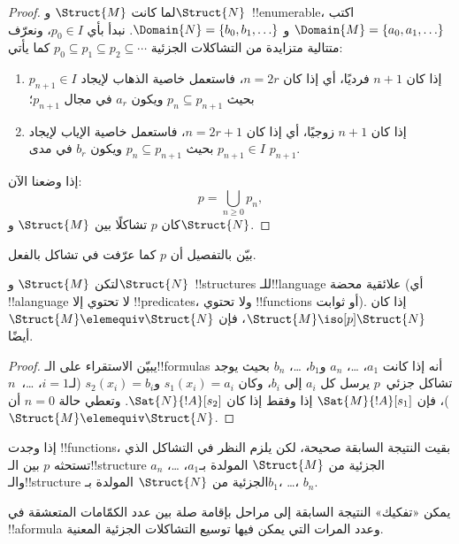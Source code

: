 \documentclass[../../../include/open-logic-section]{subfiles}
\begin{document}
\begin{proof}
  لما كانت $\Struct{M}$ و$\Struct{N}$~!!{enumerable}، اكتب
  $\Domain{M} = \{a_0, a_1, \ldots \}$ و
  $\Domain{N} = \{b_0, b_1, \ldots \}$. نبدأ بأي $p_0 \in I$، ونعرّف
  متتالية متزايدة من التشاكلات الجزئية
  $p_0 \subseteq p_1 \subseteq p_2 \subseteq \cdots$ كما يأتي:
  \begin{enumerate}
  \item إذا كان $n+1$ فرديًا، أي إذا كان $n = 2r$، فاستعمل خاصية الذهاب
    لإيجاد $p_{n+1} \in I$ بحيث $p_n \subseteq p_{n+1}$ ويكون $a_r$
    في مجال $p_{n+1}$؛
  \item إذا كان $n+1$ زوجيًا، أي إذا كان $n=2r+1$، فاستعمل خاصية الإياب
    لإيجاد $p_{n+1} \in I$ بحيث $p_n \subseteq p_{n+1}$ ويكون $b_r$
    في مدى $p_{n+1}$.
  \end{enumerate}
إذا وضعنا الآن:
\[
p = \bigcup_{n\ge 0} p_n,
\]
كان $p$ تشاكلًا بين $\Struct{M}$ و$\Struct{N}$.
\end{proof}

\begin{prob}
  بيّن بالتفصيل أن $p$ كما عرّفت في
   تشاكل بالفعل.
\end{prob}

\begin{thm}
  لتكن $\Struct{M}$ و$\Struct{N}$~!!{structure}s للـ!!{language} علائقية
  محضة (أي !!a{language} لا تحتوي إلا !!{predicate}s، ولا تحتوي
  !!{function}s أو ثوابت). إذا كان $\Struct{M} \iso[p] \Struct{N}$،
  فإن $\Struct{M} \elemequiv \Struct{N}$ أيضًا.
\end{thm}

\begin{proof}
  يبيّن الاستقراء على الـ!!{formula}s أنه إذا كانت $a_1$، \dots، $a_n$
  و$b_1$، \dots، $b_n$ بحيث يوجد تشاكل جزئي~$p$ يرسل كل $a_i$ إلى
  $b_i$، وكان $s_1(x_i)=a_i$ و$s_2(x_i)=b_i$ (لـ$i=1$، \dots،~$n$)،
  فإن $\Sat{M}{!A}[s_1]$ إذا وفقط إذا كان $\Sat{N}{!A}[s_2]$.
  وتعطي حالة $n=0$ أن $\Struct{M} \elemequiv \Struct{N}$.
\end{proof}

\begin{rem}
إذا وجدت !!{function}s، بقيت النتيجة السابقة صحيحة، لكن يلزم النظر في
التشاكل الذي تستحثه $p$ بين الـ!!{structure} الجزئية من $\Struct{M}$
المولدة بـ$a_1$، \dots، $a_n$ والـ!!{structure} الجزئية من
$\Struct{N}$ المولدة بـ$b_1$، \dots، $b_n$.
\end{rem}

يمكن «تفكيك» النتيجة السابقة إلى مراحل بإقامة صلة بين عدد الكمّامات
المتعشقة في !!a{formula} وعدد المرات التي يمكن فيها توسيع التشاكلات
الجزئية المعنية.
\end{document}
